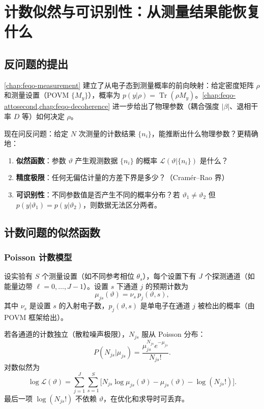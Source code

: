 \section{计数似然与可识别性：从测量结果能恢复什么}
\label{chap:feqo-inversion}

\subsection{反问题的提出}

\cref{chap:feqo-measurement} 建立了从电子态到测量概率的前向映射：给定密度矩阵 $\rho$ 和测量设置（POVM $\{M_y\}$），概率为 $p(y|\rho)=\operatorname{Tr}(\rho M_y)$。\cref{chap:feqo-attosecond,chap:feqo-decoherence} 进一步给出了物理参数（耦合强度 $|\beta|$、退相干率 $D$ 等）如何决定 $\rho$。

现在问反问题：给定 $N$ 次测量的计数结果 $\{n_i\}$，能推断出什么物理参数？更精确地：

\begin{enumerate}
\item \textbf{似然函数}：参数 $\vartheta$ 产生观测数据 $\{n_i\}$ 的概率 $\mathcal{L}(\vartheta|\{n_i\})$ 是什么？
\item \textbf{精度极限}：任何无偏估计量的方差下界是多少？（Cram\'er--Rao 界）
\item \textbf{可识别性}：不同参数值是否产生不同的概率分布？若 $\vartheta_1\neq\vartheta_2$ 但 $p(y|\vartheta_1)=p(y|\vartheta_2)$，则数据无法区分两者。
\end{enumerate}

\subsection{计数问题的似然函数}

\subsubsection{Poisson 计数模型}

设实验有 $S$ 个测量设置（如不同参考相位 $\theta_s$），每个设置下有 $J$ 个探测通道（如能量边带 $\ell=0,\ldots,J-1$）。设置 $s$ 下通道 $j$ 的预期计数为
\begin{equation}
\mu_{js}(\vartheta)=\nu_s\, p_j(\vartheta,s),
\label{eq:feqo-expected-counts}
\end{equation}
其中 $\nu_s$ 是设置 $s$ 的入射电子数，$p_j(\vartheta,s)$ 是单电子在通道 $j$ 被检出的概率（由 POVM 框架给出）。

若各通道的计数独立（散粒噪声极限），$N_{js}$ 服从 Poisson 分布：
\begin{equation}
P(N_{js}|\mu_{js})=\frac{\mu_{js}^{N_{js}}e^{-\mu_{js}}}{N_{js}!}.
\label{eq:feqo-poisson-prob}
\end{equation}
对数似然为
\begin{equation}
\log\mathcal{L}(\vartheta)=\sum_{j=1}^{J}\sum_{s=1}^{S}
\bigl[N_{js}\log\mu_{js}(\vartheta)-\mu_{js}(\vartheta)-\log(N_{js}!)\bigr].
\label{eq:feqo-count-likelihood}
\end{equation}
最后一项 $\log(N_{js}!)$ 不依赖 $\vartheta$，在优化和求导时可丢弃。


